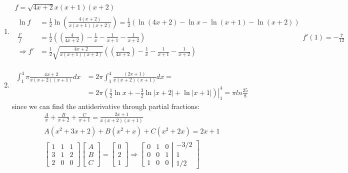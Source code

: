\documentclass[twoside]{amsart}
\theoremstyle{plain}
\theoremstyle{definition}
\newcommand{\exercisehead}[1]
  {\smallskip
   \noindent{\small\bf Exercise #1.}}
\begin{document}
\exercisehead{5} 
\begin{enumerate}
\item 
\[
\begin{gathered}
  f = \sqrt{ 4x + 2 }{ x (x+1)(x+2) } \\
  \begin{aligned}
    \ln{f} & = \frac{1}{2} \ln{ \left( \frac{ 4(x+2)}{ x (x+1)(x+2) } \right) } = \frac{1}{2} \left( \ln{ (4x+2)} - \ln{x} - \ln{(x+1)} - \ln{ (x+2) } \right) \\
    \frac{ f' }{f} & = \frac{1}{2} \left( \left( \frac{4}{4x+2} \right) - \frac{1}{x} - \frac{1}{x+1} - \frac{1}{x+2} \right) \\
\Longrightarrow f' & = \frac{1}{2} \sqrt{\frac{  4x + 2 }{ x (x+1)(x+2) } } \left( \left( \frac{4}{4x+2} \right) - \frac{1}{x} - \frac{1}{x+1} - \frac{1}{x+2} \right)
  \end{aligned}
f'(1) = -\frac{7}{12}
\end{gathered}
\]
\item
  \[
  \begin{aligned}  
    \int_1^4 \pi \frac{ 4x +2}{ x(x+2)(x+1) }dx & = 2\pi \int_1^4 \frac{ (2x+1)}{ x (x+2)(x+1) } dx = \\ 
    & = 2\pi \left. \left( \frac{1}{2} \ln{x} + -\frac{3}{2} \ln{ |x+2|} + \ln{ |x+1|} \right) \right|_1^4 = \boxed{ \pi ln{ \frac{25}{8 } } }
    \end{aligned}
\]
since we can find the antiderivative through partial fractions:
\[
\begin{gathered}
  \frac{A}{x} + \frac{B}{ x+2} + \frac{C}{ x+1} = \frac{2x+1}{ x(x+2)(x+1) } \\
  A(x^2 + 3x+ 2 ) +B (x^2 + x) + C(x^2+2x) = 2x + 1 \\
  \left[ \begin{matrix} 1 & 1 & 1 \\ 3 & 1 & 2 \\ 2 & 0 & 0 \end{matrix} \right] \left[ \begin{matrix} A \\ B \\ C \end{matrix} \right] = \left[ \begin{matrix} 0 \\ 2 \\ 1 \end{matrix} \right] \Longrightarrow \left[ \begin{matrix} 0 &  1 & 0 \\ 0 & 0 & 1 \\ 1 & 0 & 0 \end{matrix} \right| \left. \begin{matrix} -3/2 \\ 1 \\ 1/2 \end{matrix} \right]
\end{gathered}
\]
\end{enumerate}
\end{document}
